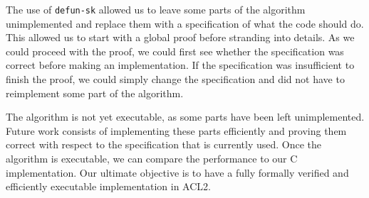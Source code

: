 \documentclass[submission,copyright]{eptcs}
\begin{document}
The use of {\tt defun-sk} allowed us to leave some parts of the algorithm unimplemented and replace them with a specification of what the code should do.
This allowed us to start with a global proof before stranding into details.
As we could proceed with the proof, we could first see whether the specification was correct before making an implementation.
If the specification was insufficient to finish the proof, we could simply change the specification and did not have to reimplement some part of the algorithm.

The algorithm is not yet executable, as some parts have been left unimplemented. Future work consists of implementing these parts efficiently and proving them correct with respect to the specification that is currently used. 
Once the algorithm is executable, we can compare the performance to our C implementation.
Our ultimate objective is to have a fully formally verified and efficiently executable implementation in ACL2.

\nocite{*}

 
\end{document}
